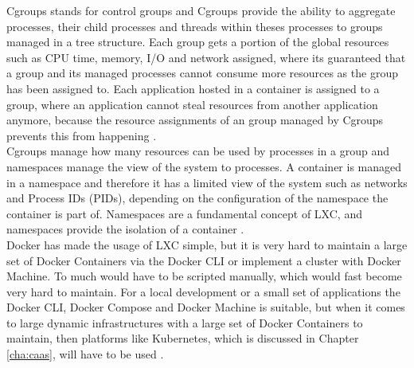 Cgroups stands for control groups and Cgroups provide the ability to aggregate processes, their child processes and threads within theses processes to groups managed in a tree structure. Each group gets a portion of the global resources such as CPU time, memory, I/O and network assigned, where its guaranteed that a group and its managed processes cannot consume more resources as the group has been assigned to. Each application hosted in a container is assigned to a group, where an application cannot steal resources from another application anymore, because the resource assignments of an group managed by Cgroups prevents this from happening \cite{KernelCGroupsV12018, KernelCGroupV22015, IntelLXCHyperVisor2014}. \\

Cgroups manage how many resources can be used by processes in a group and namespaces manage the view of the system to processes. A container is managed in a namespace and therefore it has a limited view of the system such as networks and Process IDs (PIDs), depending on the configuration of the namespace the container is part of. Namespaces are a fundamental concept of LXC, and namespaces provide the isolation of a container \cite{LinuxNamespaces2018, IntelLXCHyperVisor2014}. \\

Docker has made the usage of LXC simple, but it is very hard to maintain a large set of Docker Containers via the Docker CLI or implement a cluster with Docker Machine. To much would have to be scripted manually, which would fast become very hard to maintain. For a local development or a small set of applications the Docker CLI, Docker Compose and Docker Machine is suitable, but when it comes to large dynamic infrastructures with a large set of Docker Containers to maintain, then platforms like Kubernetes, which is discussed in Chapter \vref{cha:caas}, will have to be used \cite{DockerSwarm2018, LinuxKubernetes2018}. 
 

